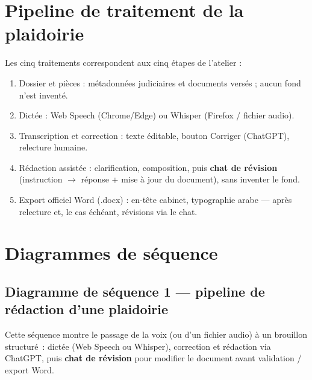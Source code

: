 \section{Pipeline de traitement de la plaidoirie}

Les cinq traitements correspondent aux cinq étapes de l'atelier :

\begin{enumerate}[label=\textbf{P\arabic*.}]
  \item Dossier et pièces : métadonnées judiciaires et documents versés ; aucun fond n'est inventé.
  \item Dictée : Web Speech (Chrome/Edge) ou Whisper (Firefox / fichier audio).
  \item Transcription et correction : texte éditable, bouton Corriger (ChatGPT), relecture humaine.
  \item Rédaction assistée : clarification, composition, puis \textbf{chat de révision} (instruction $\rightarrow$ réponse + mise à jour du document), sans inventer le fond.
  \item Export officiel Word (.docx) : en-tête cabinet, typographie arabe --- après relecture et, le cas échéant, révisions via le chat.
\end{enumerate}

\section{Diagrammes de séquence}

\subsection{Diagramme de séquence 1 --- pipeline de rédaction d'une plaidoirie}
\label{sec:seq-stt}

Cette séquence montre le passage de la voix (ou d'un fichier audio) à un brouillon structuré~: dictée (Web Speech ou Whisper), correction et rédaction via ChatGPT, puis \textbf{chat de révision} pour modifier le document avant validation / export Word.

